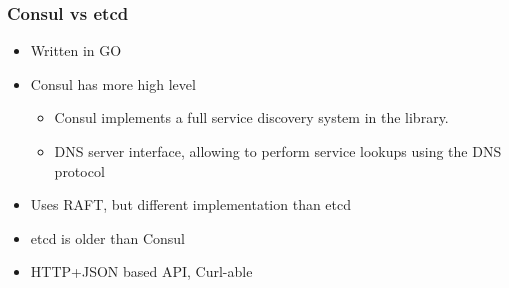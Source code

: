 \begin{frame}
    \frametitle{Consul vs etcd}

\begin{itemize}
    \item Written in GO
    \item Consul has more high level
        \begin{itemize}
            \item Consul implements a full service discovery system in the library.
            \item DNS server interface, allowing to perform service lookups using the DNS protocol
        \end{itemize}
    \item Uses RAFT, but different implementation than etcd
    \item etcd is older than Consul
    \item HTTP+JSON based API, Curl-able
\end{itemize}

\end{frame}


